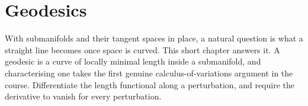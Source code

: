 \chapter{Geodesics}
\label{ch:geodesics}

With submanifolds and their tangent spaces in place, a natural question is what a straight line
becomes once space is curved. This short chapter answers it. A geodesic is a curve of locally
minimal length inside a submanifold, and characterising one takes the first genuine
calculus-of-variations argument in the course. Differentiate the length functional along a
perturbation, and require the derivative to vanish for every perturbation.




